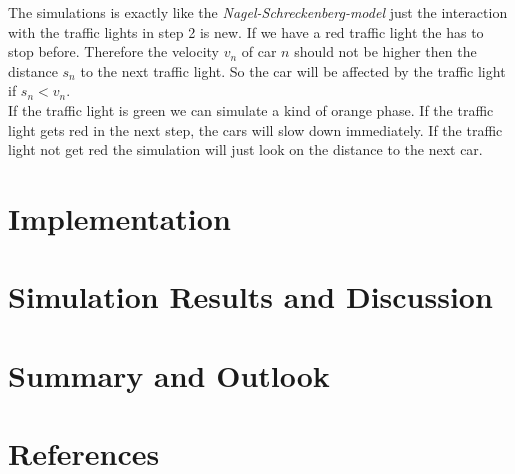 \documentclass[11pt]{article}
\begin{document}
The simulations is exactly like the \textit{Nagel-Schreckenberg-model} just the interaction with the traffic lights in step 2 is new. If we have a red traffic light the has to stop before. Therefore the velocity $v_n$ of car $n$ should not be higher then the distance $s_n$ to the next traffic light. So the car will be affected by the traffic light if $s_n<v_n$.\\
If the traffic light is green we can simulate a kind of orange phase. If the traffic light gets red in the next step, the cars will slow down immediately. If the traffic light not get red the simulation will just look on the distance to the next car.

\section{Implementation}

\section{Simulation Results and Discussion}

\section{Summary and Outlook}

\section{References}
\end{document}
